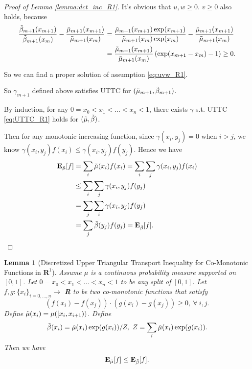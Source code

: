 \documentclass[nohyperref]{article}
\theoremstyle{plain}
\newtheorem{Lemma}{\textbf{Lemma}}
\begin{document}
\begin{proof}[Proof of Lemma \ref{lemma:dct_inc_R1}]
It's obvious that $u, w \geq 0$. 
$v \geq 0$ also holds, because
\begin{equation}
    \begin{aligned}
    \frac{\Tilde{\beta}_{m+1} (x_{m+1})}{\Tilde{\beta}_{m+1} (x_m)} - \frac{\Tilde{\mu}_{m+1} (x_{m+1})}{\Tilde{\mu}_{m+1} (x_m)} 
    &= \frac{\Tilde{\mu}_{m+1} (x_{m+1})\exp(x_{m+1})}{\Tilde{\mu}_{m+1} (x_m)\exp(x_{m})} - \frac{\Tilde{\mu}_{m+1} (x_{m+1})}{\Tilde{\mu}_{m+1} (x_m)} \\
    &= \frac{\Tilde{\mu}_{m+1} (x_{m+1})}{\Tilde{\mu}_{m+1} (x_m)} \left(\exp(x_{m+1} - x_m) - 1 \right) \geq 0.
\end{aligned} 
\label{eq:v_exist}
\end{equation}

So we can find a proper solution of assumption \eqref{eq:uvw_R1}.

So $\gamma_{m+1}$ defined above satisfies UTTC for $(\Tilde{\mu}_{m+1}, \Tilde{\beta}_{m+1})$.

By induction, for any $0 = x_0 < x_1 < \dots < x_n < 1$, there exists $\gamma$ s.t. UTTC \eqref{eq:UTTC_R1} holds for $(\Tilde{\mu}, \Tilde{\beta})$.

Then for any monotonic increasing function, since $\gamma (x_i, y_j) = 0$ when $i > j$, we know $\gamma (x_i, y_j) f(x_i) \leq \gamma (x_i, y_j) f(y_j)$.
Hence we have
\begin{equation*}
    \begin{aligned}
        \textbf{E}_{\Tilde{\mu}} [f] 
        &= \sum_i \Tilde{\mu} (x_i) f(x_i) 
        = \sum_i \sum_j \gamma (x_i, y_j) f(x_i) \\
        &\leq \sum_i \sum_j \gamma (x_i, y_j) f(y_j) \\
        &= \sum_j \sum_i \gamma (x_i, y_j) f(y_j) \\
        &= \sum_j \Tilde{\beta} (y_j) f(y_j) 
        = \textbf{E}_{\Tilde{\beta}} [f]. \\
    \end{aligned}
\end{equation*}

\end{proof}

\begin{Lemma}[Discretized Upper Triangular Transport Inequality for Co-Monotonic Functions in $\mathbf{R}^1$]
Assume $\mu$ is a continuous probability measure supported on $[0, 1]$.
Let $0 = x_0 < x_1 < \dots < x_n < 1$ to be any split of $[0, 1]$.
Let $f, g:\{x_i\}_{i=0,\dots, n} \rightarrow $ \textbf{R} to be two co-monotonic functions that satisfy
$$(f(x_i) - f(x_j)) \cdot (g(x_i) - g(x_j)) \geq 0, \ \forall \ i, j.$$
Define $\Tilde{\mu}(x_i) = \mu([x_i, x_{i+1}))$. 
Define 
$$\Tilde{\beta}(x_i) = \Tilde{\mu}(x_i) \exp(g(x_i)) / Z, \ Z = \sum_{i} \Tilde{\mu}(x_i) \exp (g(x_i)).$$
Then we have
$$
\textbf{E}_{\Tilde{\mu}} [f] \leq \textbf{E}_{\Tilde{\beta}} [f].
$$
\label{lemma:dct_R1}
\end{Lemma}
\end{document}
